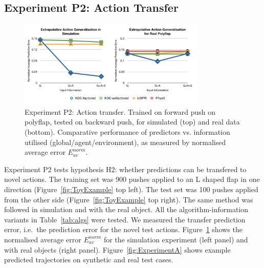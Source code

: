 \subsection{Experiment P2: Action Transfer}
\label{sec:Results.Action}

\begin{figure}[t]
\centerline{\includegraphics[width=0.8\textwidth]{./P2-graphs}}
\caption{Experiment P2: Action transfer. Trained on forward push on polyflap, tested on backward push, for simulated (top) and real data (bottom). Comparative performance of predictors vs. information utilised (global/agent/environment),
as measured by normalised average error ${E_{av}^{norm}}$.
}\label{fig:A_av_graphs}
\end{figure}

Experiment P2 tests hypothesis H2: whether predictions can be
transfered to novel actions.  The training set was 900 pushes applied to an L shaped flap in one direction (Figure~\ref{fig:ToyExample} top
left).  The test set was 100 pushes applied from the other side (Figure~\ref{fig:ToyExample} top right). The same method was followed in simulation and with the real object. All the algorithm-information variants in Table~\ref{tab:algs} were tested. We measured the transfer prediction error, i.e.\ the prediction error for the novel test actions. Figure~\ref{fig:A_av_graphs} %
shows the normalised average error $E_{av}^{norm}$ for the simulation experiment (left panel) and with real objects (right panel).
Figure~\ref{fig:ExperimentA} shows example predicted trajectories on
synthetic and real test cases.

